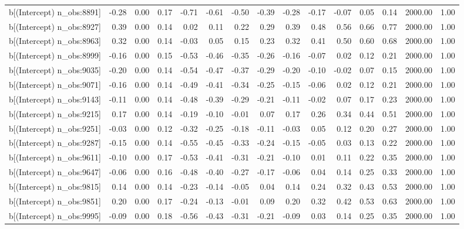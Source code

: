 \begin{table}[ht]
\begin{tabular}{rrrrrrrrrrrrrrr}
  b[(Intercept) n\_obs:8891] & -0.28 & 0.00 & 0.17 & -0.71 & -0.61 & -0.50 & -0.39 & -0.28 & -0.17 & -0.07 & 0.05 & 0.14 & 2000.00 & 1.00 \\ 
  b[(Intercept) n\_obs:8927] & 0.39 & 0.00 & 0.14 & 0.02 & 0.11 & 0.22 & 0.29 & 0.39 & 0.48 & 0.56 & 0.66 & 0.77 & 2000.00 & 1.00 \\ 
  b[(Intercept) n\_obs:8963] & 0.32 & 0.00 & 0.14 & -0.03 & 0.05 & 0.15 & 0.23 & 0.32 & 0.41 & 0.50 & 0.60 & 0.68 & 2000.00 & 1.00 \\ 
  b[(Intercept) n\_obs:8999] & -0.16 & 0.00 & 0.15 & -0.53 & -0.46 & -0.35 & -0.26 & -0.16 & -0.07 & 0.02 & 0.12 & 0.21 & 2000.00 & 1.00 \\ 
  b[(Intercept) n\_obs:9035] & -0.20 & 0.00 & 0.14 & -0.54 & -0.47 & -0.37 & -0.29 & -0.20 & -0.10 & -0.02 & 0.07 & 0.15 & 2000.00 & 1.00 \\ 
  b[(Intercept) n\_obs:9071] & -0.16 & 0.00 & 0.14 & -0.49 & -0.41 & -0.34 & -0.25 & -0.15 & -0.06 & 0.02 & 0.12 & 0.21 & 2000.00 & 1.00 \\ 
  b[(Intercept) n\_obs:9143] & -0.11 & 0.00 & 0.14 & -0.48 & -0.39 & -0.29 & -0.21 & -0.11 & -0.02 & 0.07 & 0.17 & 0.23 & 2000.00 & 1.00 \\ 
  b[(Intercept) n\_obs:9215] & 0.17 & 0.00 & 0.14 & -0.19 & -0.10 & -0.01 & 0.07 & 0.17 & 0.26 & 0.34 & 0.44 & 0.51 & 2000.00 & 1.00 \\ 
  b[(Intercept) n\_obs:9251] & -0.03 & 0.00 & 0.12 & -0.32 & -0.25 & -0.18 & -0.11 & -0.03 & 0.05 & 0.12 & 0.20 & 0.27 & 2000.00 & 1.00 \\ 
  b[(Intercept) n\_obs:9287] & -0.15 & 0.00 & 0.14 & -0.55 & -0.45 & -0.33 & -0.24 & -0.15 & -0.05 & 0.03 & 0.13 & 0.22 & 2000.00 & 1.00 \\ 
  b[(Intercept) n\_obs:9611] & -0.10 & 0.00 & 0.17 & -0.53 & -0.41 & -0.31 & -0.21 & -0.10 & 0.01 & 0.11 & 0.22 & 0.35 & 2000.00 & 1.00 \\ 
  b[(Intercept) n\_obs:9647] & -0.06 & 0.00 & 0.16 & -0.48 & -0.40 & -0.27 & -0.17 & -0.06 & 0.04 & 0.14 & 0.25 & 0.33 & 2000.00 & 1.00 \\ 
  b[(Intercept) n\_obs:9815] & 0.14 & 0.00 & 0.14 & -0.23 & -0.14 & -0.05 & 0.04 & 0.14 & 0.24 & 0.32 & 0.43 & 0.53 & 2000.00 & 1.00 \\ 
  b[(Intercept) n\_obs:9851] & 0.20 & 0.00 & 0.17 & -0.24 & -0.13 & -0.01 & 0.09 & 0.20 & 0.32 & 0.42 & 0.53 & 0.63 & 2000.00 & 1.00 \\ 
  b[(Intercept) n\_obs:9995] & -0.09 & 0.00 & 0.18 & -0.56 & -0.43 & -0.31 & -0.21 & -0.09 & 0.03 & 0.14 & 0.25 & 0.35 & 2000.00 & 1.00 \\ 

\end{tabular}
\end{table}
